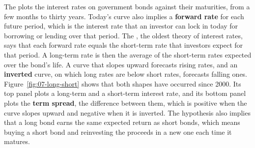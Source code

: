 The  plots the interest rates on government bonds against their maturities, from a few months to thirty years. Today's curve also implies a \textbf{forward rate} for each future period, which is the interest rate that an investor can lock in today for borrowing or lending over that period. The , the oldest theory of interest rates, says that each forward rate equals the short-term rate that investors expect for that period. A long-term rate is then the average of the short-term rates expected over the bond's life. A curve that slopes upward forecasts rising rates, and an \textbf{inverted} curve, on which long rates are below short rates, forecasts falling ones. Figure~\ref{fig:07-long-short} shows that both shapes have occurred since 2000. Its top panel plots a long-term and a short-term interest rate, and its bottom panel plots the \textbf{term spread}, the difference between them, which is positive when the curve slopes upward and negative when it is inverted. The hypothesis also implies that a long bond earns the same expected return as  short bonds, which means buying a short bond and reinvesting the proceeds in a new one each time it matures.

\ratesdata

